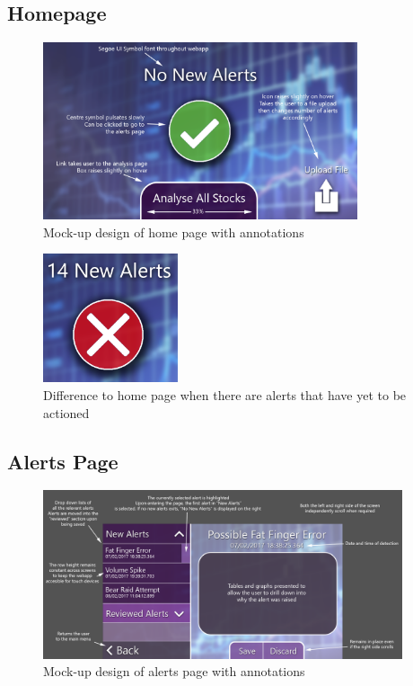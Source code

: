 \documentclass[11pt, oneside, a4paper]{article}
\begin{document}
\subsection{Homepage}

\begin{figure}[h]
	\centering
		\includegraphics[width=350px]{HomepageUIDesign.png}
	\caption{Mock-up design of home page with annotations}
	\label{HomeUI}
\end{figure}

\begin{figure}[h]
	\centering
		\includegraphics[width=150px]{HomepageUIDesignAlerts.png}
	\caption{Difference to home page when there are alerts that have yet to be actioned}
	\label{HomeUIAlerts}
\end{figure}

\newpage
\subsection{Alerts Page}

\begin{figure}[h]
	\centering
		\includegraphics[width=400px]{AlertsUIDesign.png}
	\caption{Mock-up design of alerts page with annotations}
	\label{AlertsUI}
\end{figure}
\end{document}
